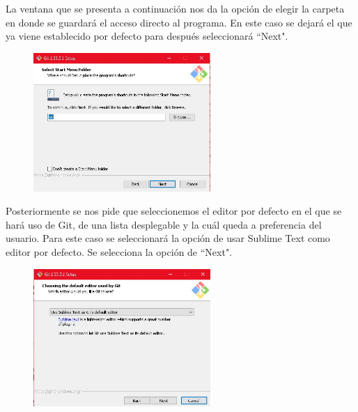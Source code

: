 \documentclass[10pt,a4paper]{article} %
\begin{document}
\begin{enumerate}
{			\pagebreak
			\item La ventana que se presenta a continuaci{\' o}n nos da la opci{\' o}n de elegir la carpeta en donde se guardar{\' a} el acceso directo al programa. En este caso se dejar{\' a} el que ya viene establecido por defecto para despu{\' e}s seleccionar{\' a} ``Next".
			\begin{figure}[H]
				\includegraphics[width=0.6\textwidth]{7.jpg}
				\centering
				\label{img:paso7}
			\end{figure}
			\item Posteriormente se nos pide que seleccionemos el editor por defecto en el que se har{\' a} uso de Git, de una lista desplegable y la cu{\' a}l queda a preferencia del usuario. Para este caso se seleccionar{\' a} la opci{\' o}n de usar Sublime Text como editor por defecto. Se selecciona la opción de ``Next".
			\begin{figure}[H]
				\includegraphics[width=0.6\textwidth]{8.jpg}
				\centering
				\label{img:paso8}
			\end{figure}
			
}
\end{enumerate}
\end{document}
